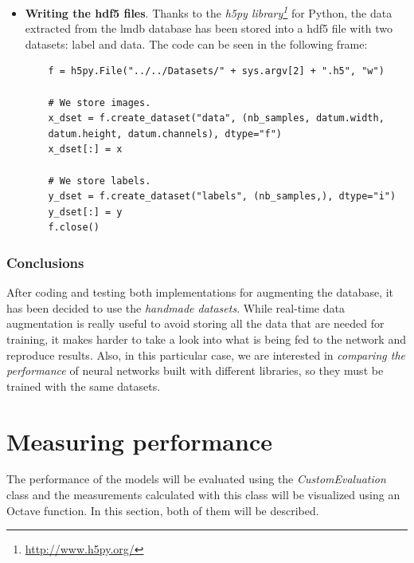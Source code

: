 \begin{itemize}
\begin{lstlisting}
		x.append(im)
		y.append(label)
		nb_samples += 1
		
		print("Extracted samples: " + str(nb_samples) + "\n")
	
	x = np.asarray(x)
	y = np.asarray(y)
\end{lstlisting}
	
	\item \textbf{Writing the \gls{hdf5} files}. Thanks to the \emph{h5py library\footnote{\url{http://www.h5py.org/}}} for Python, the data extracted from the \gls{lmdb} database has been stored into a \gls{hdf5} file with two datasets: label and data. The code can be seen in the following frame:	 
	\begin{lstlisting}
	f = h5py.File("../../Datasets/" + sys.argv[2] + ".h5", "w")
	
	# We store images.
	x_dset = f.create_dataset("data", (nb_samples, datum.width,
	datum.height, datum.channels), dtype="f")
	x_dset[:] = x
	
	# We store labels.
	y_dset = f.create_dataset("labels", (nb_samples,), dtype="i")
	y_dset[:] = y
	f.close()
	\end{lstlisting}
\end{itemize} 

\subsubsection{Conclusions}
After coding and testing both implementations for augmenting the database, it has been decided to use the \emph{handmade datasets}. While real-time data augmentation is really useful to avoid storing all the data that are needed for training, it makes harder to take a look into what is being fed to the network and reproduce results. Also, in this particular case, we are interested in \emph{comparing the performance} of neural networks built with different libraries, so they must be trained with the same datasets.

\section{Measuring performance}\label{sec:measuring}
The performance of the models will be evaluated using the \textit{CustomEvaluation} class and the measurements calculated with this class will be visualized using an Octave function. In this section, both of them will be described.

